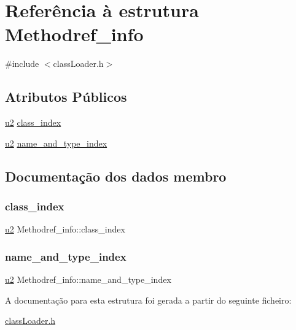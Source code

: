 \hypertarget{struct_methodref__info}{}\section{Referência à estrutura Methodref\+\_\+info}
\label{struct_methodref__info}


{\ttfamily \#include $<$class\+Loader.\+h$>$}

\subsection*{Atributos Públicos}
\begin{DoxyCompactItemize}
\item 
\hyperlink{util_8h_a55ef8d87fd202b8417704c089899c5b9}{u2} \hyperlink{struct_methodref__info_ac063abb9eadee233a7406a77ca4fc686}{class\+\_\+index}
\item 
\hyperlink{util_8h_a55ef8d87fd202b8417704c089899c5b9}{u2} \hyperlink{struct_methodref__info_a6b515f59d6782cbc729473baf7da047f}{name\+\_\+and\+\_\+type\+\_\+index}
\end{DoxyCompactItemize}


\subsection{Documentação dos dados membro}
\mbox{\label{struct_methodref__info_ac063abb9eadee233a7406a77ca4fc686}} 
\subsubsection{\texorpdfstring{class\+\_\+index}{class\_index}}
{\footnotesize\ttfamily \hyperlink{util_8h_a55ef8d87fd202b8417704c089899c5b9}{u2} Methodref\+\_\+info\+::class\+\_\+index}

\mbox{\label{struct_methodref__info_a6b515f59d6782cbc729473baf7da047f}} 
\subsubsection{\texorpdfstring{name\+\_\+and\+\_\+type\+\_\+index}{name\_and\_type\_index}}
{\footnotesize\ttfamily \hyperlink{util_8h_a55ef8d87fd202b8417704c089899c5b9}{u2} Methodref\+\_\+info\+::name\+\_\+and\+\_\+type\+\_\+index}



A documentação para esta estrutura foi gerada a partir do seguinte ficheiro\+:\begin{DoxyCompactItemize}
\item 
\hyperlink{class_loader_8h}{class\+Loader.\+h}\end{DoxyCompactItemize}
